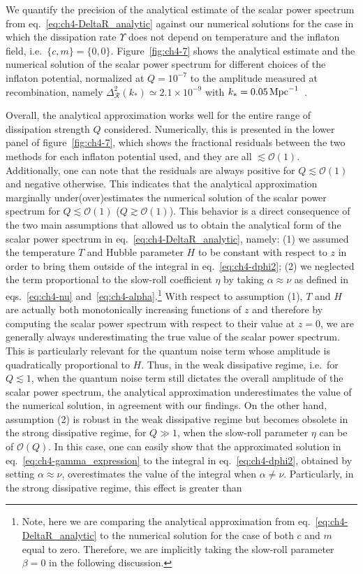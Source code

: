 We quantify the precision of the analytical estimate of the scalar power spectrum from eq.~\eqref{eq:ch4-DeltaR_analytic} against our numerical solutions for the case in which the dissipation rate $\Upsilon$ does not depend on temperature and the inflaton field, i.e.\ $\{c,m\}=\{0,0\}$. Figure~\ref{fig:ch4-7} shows the analytical estimate and the numerical solution of the scalar power spectrum for different choices of the inflaton potential, normalized at $Q=10^{-7}$ to the amplitude measured at recombination, namely $\Delta^2_{\mathcal{R}}(k_*)\simeq 2.1\times10^{-9}$ with $k_*=0.05{\rm\,Mpc}^{-1}$~\cite{Planck:2018vyg}.

Overall, the analytical approximation works well for the entire range of dissipation strength $Q$ considered. Numerically, this is presented in the lower panel of figure~\ref{fig:ch4-7}, which shows the fractional residuals between the two methods for each inflaton potential used, and they are all $\lesssim \mathcal{O}(1)$. Additionally, one can note that the residuals are always positive for $Q\lesssim \mathcal{O}(1)$ and negative otherwise. This indicates that the analytical approximation marginally under(over)estimates the numerical solution of the scalar power spectrum for $Q\lesssim\mathcal{O}(1)$ ($Q\gtrsim\mathcal{O}(1)$). This behavior is a direct consequence of the two main assumptions that allowed us to obtain the analytical form of the scalar power spectrum in eq.~\eqref{eq:ch4-DeltaR_analytic}, namely: (1) we assumed the temperature $T$ and Hubble parameter $H$ to be constant with respect to $z$ in order to bring them outside of the integral in eq.~\eqref{eq:ch4-dphi2}; (2) we neglected the term proportional to the slow-roll coefficient $\eta$ by taking $\alpha\approx\nu$ as defined in eqs.~\eqref{eq:ch4-nu} and~\eqref{eq:ch4-alpha}.\footnote{Note, here we are comparing the analytical approximation from eq.~\eqref{eq:ch4-DeltaR_analytic} to the numerical solution for the case of both $c$ and $m$ equal to zero. Therefore, we are implicitly taking the slow-roll parameter $\beta=0$ in the following discussion.} With respect to assumption (1), $T$ and $H$ are actually both monotonically increasing functions of $z$ and therefore by computing the scalar power spectrum with respect to their value at $z=0$, we are generally always underestimating the true value of the scalar power spectrum. This is particularly relevant for the quantum noise term whose amplitude is quadratically proportional to $H$. Thus, in the weak dissipative regime, i.e.\ for $Q\lesssim 1$, when the quantum noise term still dictates the overall amplitude of the scalar power spectrum, the analytical approximation underestimates the value of the numerical solution, in agreement with our findings. On the other hand, assumption (2) is robust in the weak dissipative regime but becomes obsolete in the strong dissipative regime, for $Q\gg1$, when the slow-roll parameter $\eta$ can be of $\mathcal{O}(Q)$. In this case, one can easily show that the approximated solution in eq.~\eqref{eq:ch4-gamma_expression} to the integral in eq.~\eqref{eq:ch4-dphi2}, obtained by setting $\alpha\approx\nu$, overestimates the value of the integral when $\alpha\neq\nu $. Particularly, in the strong dissipative regime, this effect is greater than 